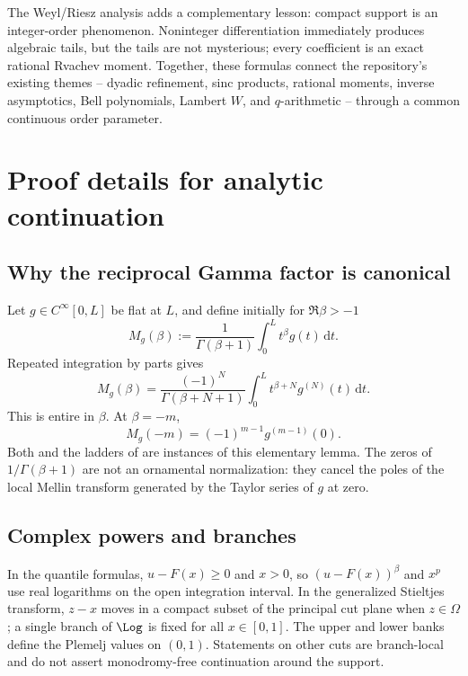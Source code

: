 \documentclass[11pt,oneside]{article}
\theoremstyle{definition}
\theoremstyle{remark}
\newcommand{\dd}{\,\mathrm d}
\newcommand{\1}{\mathbf 1}
\begin{document}
The Weyl/Riesz analysis adds a complementary lesson: compact support is an
integer-order phenomenon.  Noninteger differentiation immediately produces
algebraic tails, but the tails are not mysterious; every coefficient is an
exact rational Rvachev moment.  Together, these formulas connect the
repository's existing themes -- dyadic refinement, sinc products, rational
moments, inverse asymptotics, Bell polynomials, Lambert $W$, and
$q$-arithmetic -- through a common continuous order parameter.

\appendix

\section{Proof details for analytic continuation}
\label{p11:app:continuation}

\subsection{Why the reciprocal Gamma factor is canonical}

Let $g\in C^\infty[0,L]$ be flat at $L$, and define initially for
$\Re\beta>-1$
\begin{equation}
 M_g(\beta):=\frac1{\Gamma(\beta+1)}\int_0^L t^\beta g(t)\dd t.
\end{equation}
Repeated integration by parts gives
\begin{equation}
 M_g(\beta)
 =\frac{(-1)^N}{\Gamma(\beta+N+1)}
  \int_0^L t^{\beta+N}g^{(N)}(t)\dd t.
 \label{p11:eq:generic-entire-Mellin}
\end{equation}
This is entire in $\beta$.  At $\beta=-m$,
\begin{equation}
 M_g(-m)=(-1)^{m-1}g^{(m-1)}(0).
 \label{p11:eq:generic-negative-value}
\end{equation}
Both  and the ladders of  are
instances of this elementary lemma.  The zeros of $1/\Gamma(\beta+1)$ are
not an ornamental normalization: they cancel the poles of the local Mellin
transform generated by the Taylor series of $g$ at zero.

\subsection{Complex powers and branches}

In the quantile formulas, $u-F(x)\ge0$ and $x>0$, so
$(u-F(x))^\beta$ and $x^p$ use real logarithms on the open integration
interval.  In the generalized Stieltjes transform, $z-x$ moves in a compact
subset of the principal cut plane when $z\in\Omega$; a single branch of
$\Log$ is fixed for all $x\in[0,1]$.  The upper and lower banks define the
Plemelj values on $(0,1)$.  Statements on other cuts are branch-local and do
not assert monodromy-free continuation around the support.
\end{document}

